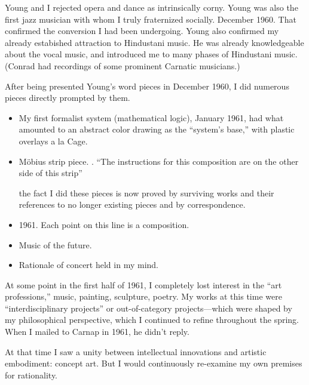 \Pb

Young and I rejected opera and dance as intrinsically corny.
Young was also the first jazz musician with whom I truly fraternized socially.  December 1960.  That confirmed the conversion I had been undergoing. Young also confirmed my already estabished attraction to Hindustani music.  He was already knowledgeable about the vocal music, and introduced me to many phases of Hindustani music.  (Conrad had recordings of some prominent Carnatic musicians.)

After being presented Young's word pieces in December 1960, I did numerous pieces directly prompted by them.

\Pb

\begin{itemize}
\item My first formalist system (mathematical logic), January 1961, had what amounted to an abstract color drawing as the \enquote{system's base,} with plastic overlays a la Cage.
\item Möbius strip piece.  .  \enquote{The instructions for this composition are on the other side of this strip}   

the fact I did these pieces is now proved by surviving works and their references to no longer existing pieces and by correspondence.
\item 1961.  Each point on this line is a composition.
\item Music of the future. 
\item Rationale of concert held in my mind.
\end{itemize}

\Pb

At some point in the first half of 1961, I completely lost interest in the \enquote{art professions,} music, painting, sculpture, poetry.  My works at this time were \enquote{interdisciplinary projects} or out-of-category projects---which were shaped by my philosophical perspective, which I continued to refine throughout the spring.  When I mailed  to Carnap in 1961, he didn't reply.  

At that time I saw a unity between intellectual innovations and artistic embodiment:  concept art.  But I would continuously re-examine my own premises for rationality.

